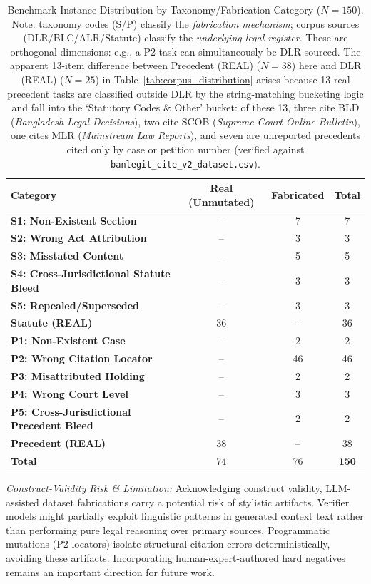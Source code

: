 \documentclass[conference]{IEEEtran}
\begin{document}
\begin{table}[htbp]
\caption{Benchmark Instance Distribution by Taxonomy/Fabrication Category ($N=150$). Note: taxonomy codes (S/P) classify the \textit{fabrication mechanism}; corpus sources (DLR/BLC/ALR/Statute) classify the \textit{underlying legal register}. These are orthogonal dimensions: e.g., a P2 task can simultaneously be DLR-sourced. The apparent 13-item difference between Precedent (REAL) ($N=38$) here and DLR (REAL) ($N=25$) in Table~\ref{tab:corpus_distribution} arises because 13 real precedent tasks are classified outside DLR by the string-matching bucketing logic and fall into the `Statutory Codes \& Other' bucket: of these 13, three cite BLD (\textit{Bangladesh Legal Decisions}), two cite SCOB (\textit{Supreme Court Online Bulletin}), one cites MLR (\textit{Mainstream Law Reports}), and seven are unreported precedents cited only by case or petition number (verified against \texttt{banlegit\_cite\_v2\_dataset.csv}).}
\label{tab:dataset_distribution}
\centering
\begin{tabular}{lccc}
\toprule
\textbf{Category} & \textbf{Real (Unmutated)} & \textbf{Fabricated} & \textbf{Total} \\
\midrule
\textbf{S1: Non-Existent Section} & -- & 7 & 7 \\
\textbf{S2: Wrong Act Attribution} & -- & 3 & 3 \\
\textbf{S3: Misstated Content} & -- & 5 & 5 \\
\textbf{S4: Cross-Jurisdictional Statute Bleed} & -- & 3 & 3 \\
\textbf{S5: Repealed/Superseded} & -- & 3 & 3 \\
\textbf{Statute (REAL)} & 36 & -- & 36 \\
\midrule
\textbf{P1: Non-Existent Case} & -- & 2 & 2 \\
\textbf{P2: Wrong Citation Locator} & -- & 46 & 46 \\
\textbf{P3: Misattributed Holding} & -- & 2 & 2 \\
\textbf{P4: Wrong Court Level} & -- & 3 & 3 \\
\textbf{P5: Cross-Jurisdictional Precedent Bleed} & -- & 2 & 2 \\
\textbf{Precedent (REAL)} & 38 & -- & 38 \\
\midrule
\textbf{Total} & 74 & 76 & \textbf{150} \\
\bottomrule
\end{tabular}
\end{table}

\textit{Construct-Validity Risk \& Limitation:} Acknowledging construct validity, LLM-assisted dataset fabrications carry a potential risk of stylistic artifacts. Verifier models might partially exploit linguistic patterns in generated context text rather than performing pure legal reasoning over primary sources. Programmatic mutations (P2 locators) isolate structural citation errors deterministically, avoiding these artifacts. Incorporating human-expert-authored hard negatives remains an important direction for future work.
\end{document}
